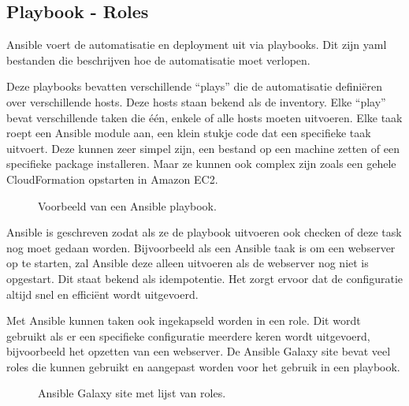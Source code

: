 \subsection{Playbook - Roles}
Ansible voert de automatisatie en deployment uit via playbooks. Dit zijn yaml bestanden die beschrijven hoe de automatisatie moet verlopen. 

Deze playbooks bevatten verschillende ``plays'' die de automatisatie definiëren over verschillende hosts. Deze hosts staan bekend als de inventory. Elke ``play'' bevat verschillende taken die één, enkele of alle hosts moeten uitvoeren. Elke taak roept een Ansible module aan, een klein stukje code dat een specifieke taak uitvoert. Deze kunnen zeer simpel zijn, een bestand op een machine zetten of een specifieke package installeren. Maar ze kunnen ook complex zijn zoals een gehele CloudFormation opstarten in Amazon EC2.
\begin{figure}[!htb]
	\caption{Voorbeeld van een Ansible playbook. \autocite{ansibleplaybook}}
	\label{fig:playbook}
\end{figure}

Ansible is geschreven zodat als ze de playbook uitvoeren ook checken of deze task nog moet gedaan worden. Bijvoorbeeld als een Ansible taak is om een webserver op te starten, zal Ansible deze alleen uitvoeren als de webserver nog niet is opgestart. Dit staat bekend als idempotentie. Het zorgt ervoor dat de configuratie altijd snel en efficiënt wordt uitgevoerd.

\newpage
Met Ansible kunnen taken ook ingekapseld worden in een role. Dit wordt gebruikt als er een specifieke configuratie meerdere keren wordt uitgevoerd, bijvoorbeeld het opzetten van een webserver. De Ansible Galaxy site bevat veel roles die kunnen gebruikt en aangepast worden voor het gebruik in een playbook.
\begin{figure}[!htb]
	\caption{Ansible Galaxy site met lijst van roles.}
	\label{fig:agalaxy}
\end{figure}


